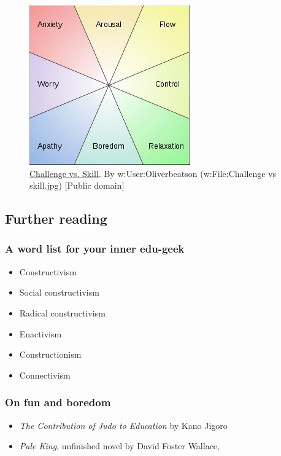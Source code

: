\begin{figure}
\begin{center}
\includegraphics[width=.5\textwidth]{../pictures/challenge.jpg} 
\end{center}
\caption{
\href{http://commons.wikimedia.org/wiki/File\%3AChallenge\_vs\_skill.svg}{Challenge vs. Skill}. By w:User:Oliverbeatson (w:File:Challenge vs skill.jpg)
{[}Public domain{]}}
\end{figure}

\subsection{Further reading}

\subsubsection{A word list for your inner edu-geek}

\begin{itemize}
\item
  Constructivism
\item
  Social constructivism
\item
  Radical constructivism
\item
  Enactivism
\item
  Constructionism
\item
  Connectivism
\end{itemize}

\subsubsection{On fun and boredom}

\begin{itemize}
\item
  \emph{The Contribution of Judo to Education} by Kano Jigoro
\item
  \emph{Pale King}, unfinished novel by David Foster Wallace,
\end{itemize}

